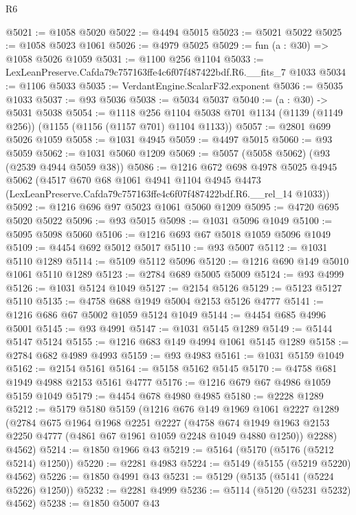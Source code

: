 \begin{lexlean}{R6}
\begin{coremodule}
@5021 := @1058 @5020
@5022 := @4494 @5015
@5023 := @5021 @5022
@5025 := @1058 @5023 @1061
@5026 := @4979 @5025
@5029 := fun (a : @30) => @1058 @5026 @1059
@5031 := @1100 @256 @1104
@5033 := LexLeanPreserve.Cafda79c757163ffe4c6f07f487422bdf.R6.__fits_7 @1033
@5034 := @1106 @5033
@5035 := VerdantEngine.ScalarF32.exponent
@5036 := @5035 @1033
@5037 := @93 @5036
@5038 := @5034 @5037
@5040 := (a : @30) -> @5031 @5038
@5054 := @1118
    @256
    @1104
    @5038
    @701
    @1134
    (@1139 (@1149 @256))
    (@1155 (@1156 (@1157 @701) @1104 @1133))
@5057 := @2801 @699 @5026 @1059
@5058 := @1031 @4945
@5059 := @4497 @5015
@5060 := @93 @5059
@5062 := @1031 @5060 @1209
@5069 := @5057 (@5058 @5062) (@93 (@2539 @4944 @5059 @38))
@5086 := @1216
    @672
    @698
    @4978
    @5025
    @4945
    @5062
    (@4517
      @670
      @68
      @1061
      @4941
      @1104
      @4945
      @4473
      (LexLeanPreserve.Cafda79c757163ffe4c6f07f487422bdf.R6.__rel_14 @1033))
@5092 := @1216 @696 @97 @5023 @1061 @5060 @1209
@5095 := @4720 @695 @5020 @5022
@5096 := @93 @5015
@5098 := @1031 @5096 @1049
@5100 := @5095 @5098 @5060
@5106 := @1216 @693 @67 @5018 @1059 @5096 @1049
@5109 := @4454 @692 @5012 @5017
@5110 := @93 @5007
@5112 := @1031 @5110 @1289
@5114 := @5109 @5112 @5096
@5120 := @1216 @690 @149 @5010 @1061 @5110 @1289
@5123 := @2784 @689 @5005 @5009
@5124 := @93 @4999
@5126 := @1031 @5124 @1049
@5127 := @2154 @5126
@5129 := @5123 @5127 @5110
@5135 := @4758 @688 @1949 @5004 @2153 @5126 @4777
@5141 := @1216 @686 @67 @5002 @1059 @5124 @1049
@5144 := @4454 @685 @4996 @5001
@5145 := @93 @4991
@5147 := @1031 @5145 @1289
@5149 := @5144 @5147 @5124
@5155 := @1216 @683 @149 @4994 @1061 @5145 @1289
@5158 := @2784 @682 @4989 @4993
@5159 := @93 @4983
@5161 := @1031 @5159 @1049
@5162 := @2154 @5161
@5164 := @5158 @5162 @5145
@5170 := @4758 @681 @1949 @4988 @2153 @5161 @4777
@5176 := @1216 @679 @67 @4986 @1059 @5159 @1049
@5179 := @4454 @678 @4980 @4985
@5180 := @2228 @1289
@5212 := @5179
    @5180
    @5159
    (@1216
      @676
      @149
      @1969
      @1061
      @2227
      @1289
      (@2784
        @675
        @1964
        @1968
        @2251
        @2227
        (@4758 @674 @1949 @1963 @2153 @2250 @4777 (@4861 @67 @1961 @1059 @2248 @1049 @4880 @1250))
        @2288)
      @4562)
@5214 := @1850 @1966 @43
@5219 := @5164 (@5170 (@5176 (@5212 @5214) @1250))
@5220 := @2281 @4983
@5224 := @5149 (@5155 (@5219 @5220) @4562)
@5226 := @1850 @4991 @43
@5231 := @5129 (@5135 (@5141 (@5224 @5226) @1250))
@5232 := @2281 @4999
@5236 := @5114 (@5120 (@5231 @5232) @4562)
@5238 := @1850 @5007 @43

\end{coremodule}
\end{lexlean}
